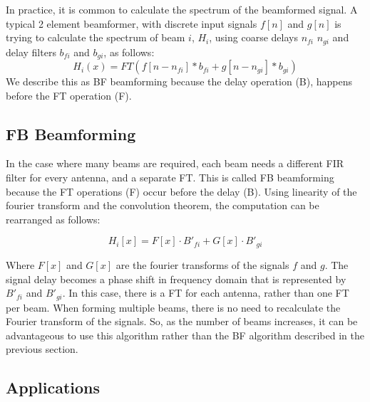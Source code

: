 In practice, it is common to calculate the spectrum of the beamformed signal. 
A typical 2 element beamformer, with discrete input signals $f[n]$ and $g[n]$ is trying to calculate the spectrum of beam $i$, $H_i$, using coarse delays $n_{fi}$  $n_{gi}$ and delay filters $b_{fi}$ and $b_{gi}$, as follows: 
\[H_i(x) = FT(f[n-n_{fi}]\ast b_{fi} + g[n-n_{gi}]\ast b_{gi})\]
We describe this as BF beamforming because the delay operation (B), happens before the FT operation (F).


\subsection{FB Beamforming}
In the case where many beams are required, each beam needs a different FIR filter for every antenna, and a separate FT. 
This is called FB beamforming because the FT operations (F) occur before the delay (B). 
Using linearity of the fourier transform and the convolution theorem, the computation can be rearranged as follows:

\[H_i[x] = F[x] \cdot B'_{fi} + G[x] \cdot B'_{gi}\]

Where $F[x]$ and $G[x]$ are the fourier transforms of the signals $f$ and $g$.
The signal delay becomes a phase shift in frequency domain that is represented by $B'_{fi}$ and $B'_{gi}$. 
In this case, there is a FT for each antenna, rather than one FT per beam. 
When forming multiple beams, there is no need to recalculate the Fourier transform of the signals. 
So, as the number of beams increases, it can be advantageous to use this algorithm rather than the BF algorithm described in the previous section. 

\subsection{Applications}



